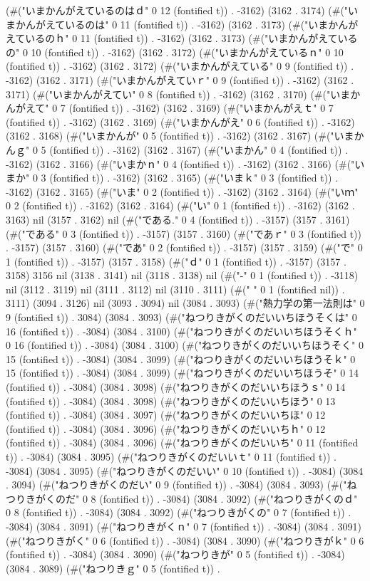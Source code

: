 (#("いまかんがえているのはｄ" 0 12 (fontified t)) . -3162) (3162 . 3174) (#("いまかんがえているのは" 0 11 (fontified t)) . -3162) (3162 . 3173) (#("いまかんがえているのｈ" 0 11 (fontified t)) . -3162) (3162 . 3173) (#("いまかんがえているの" 0 10 (fontified t)) . -3162) (3162 . 3172) (#("いまかんがえているｎ" 0 10 (fontified t)) . -3162) (3162 . 3172) (#("いまかんがえている" 0 9 (fontified t)) . -3162) (3162 . 3171) (#("いまかんがえていｒ" 0 9 (fontified t)) . -3162) (3162 . 3171) (#("いまかんがえてい" 0 8 (fontified t)) . -3162) (3162 . 3170) (#("いまかんがえて" 0 7 (fontified t)) . -3162) (3162 . 3169) (#("いまかんがえｔ" 0 7 (fontified t)) . -3162) (3162 . 3169) (#("いまかんがえ" 0 6 (fontified t)) . -3162) (3162 . 3168) (#("いまかんが" 0 5 (fontified t)) . -3162) (3162 . 3167) (#("いまかんｇ" 0 5 (fontified t)) . -3162) (3162 . 3167) (#("いまかん" 0 4 (fontified t)) . -3162) (3162 . 3166) (#("いまかｎ" 0 4 (fontified t)) . -3162) (3162 . 3166) (#("いまか" 0 3 (fontified t)) . -3162) (3162 . 3165) (#("いまｋ" 0 3 (fontified t)) . -3162) (3162 . 3165) (#("いま" 0 2 (fontified t)) . -3162) (3162 . 3164) (#("いｍ" 0 2 (fontified t)) . -3162) (3162 . 3164) (#("い" 0 1 (fontified t)) . -3162) (3162 . 3163) nil (3157 . 3162) nil (#("である." 0 4 (fontified t)) . -3157) (3157 . 3161) (#("である" 0 3 (fontified t)) . -3157) (3157 . 3160) (#("であｒ" 0 3 (fontified t)) . -3157) (3157 . 3160) (#("であ" 0 2 (fontified t)) . -3157) (3157 . 3159) (#("で" 0 1 (fontified t)) . -3157) (3157 . 3158) (#("ｄ" 0 1 (fontified t)) . -3157) (3157 . 3158) 3156 nil (3138 . 3141) nil (3118 . 3138) nil (#("-" 0 1 (fontified t)) . -3118) nil (3112 . 3119) nil (3111 . 3112) nil (3110 . 3111) (#(" " 0 1 (fontified nil)) . 3111) (3094 . 3126) nil (3093 . 3094) nil (3084 . 3093) (#("熱力学の第一法則は" 0 9 (fontified t)) . 3084) (3084 . 3093) (#("ねつりきがくのだいいちほうそくは" 0 16 (fontified t)) . -3084) (3084 . 3100) (#("ねつりきがくのだいいちほうそくｈ" 0 16 (fontified t)) . -3084) (3084 . 3100) (#("ねつりきがくのだいいちほうそく" 0 15 (fontified t)) . -3084) (3084 . 3099) (#("ねつりきがくのだいいちほうそｋ" 0 15 (fontified t)) . -3084) (3084 . 3099) (#("ねつりきがくのだいいちほうそ" 0 14 (fontified t)) . -3084) (3084 . 3098) (#("ねつりきがくのだいいちほうｓ" 0 14 (fontified t)) . -3084) (3084 . 3098) (#("ねつりきがくのだいいちほう" 0 13 (fontified t)) . -3084) (3084 . 3097) (#("ねつりきがくのだいいちほ" 0 12 (fontified t)) . -3084) (3084 . 3096) (#("ねつりきがくのだいいちｈ" 0 12 (fontified t)) . -3084) (3084 . 3096) (#("ねつりきがくのだいいち" 0 11 (fontified t)) . -3084) (3084 . 3095) (#("ねつりきがくのだいいｔ" 0 11 (fontified t)) . -3084) (3084 . 3095) (#("ねつりきがくのだいい" 0 10 (fontified t)) . -3084) (3084 . 3094) (#("ねつりきがくのだい" 0 9 (fontified t)) . -3084) (3084 . 3093) (#("ねつりきがくのだ" 0 8 (fontified t)) . -3084) (3084 . 3092) (#("ねつりきがくのｄ" 0 8 (fontified t)) . -3084) (3084 . 3092) (#("ねつりきがくの" 0 7 (fontified t)) . -3084) (3084 . 3091) (#("ねつりきがくｎ" 0 7 (fontified t)) . -3084) (3084 . 3091) (#("ねつりきがく" 0 6 (fontified t)) . -3084) (3084 . 3090) (#("ねつりきがｋ" 0 6 (fontified t)) . -3084) (3084 . 3090) (#("ねつりきが" 0 5 (fontified t)) . -3084) (3084 . 3089) (#("ねつりきｇ" 0 5 (fontified t)) . 